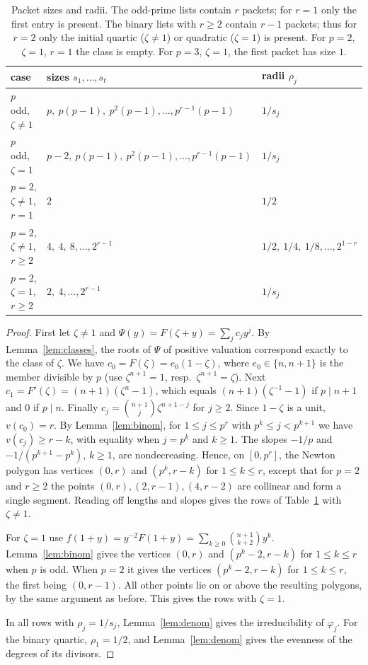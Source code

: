 \documentclass[11pt]{amsart}
\theoremstyle{definition}
\theoremstyle{remark}
\numberwithin{equation}{section}
\begin{document}
\begin{table}[ht]
\centering
\renewcommand{\arraystretch}{1.25}
\begin{tabular}{@{}lll@{}}
\toprule
case & sizes $s_1,\dots,s_t$ & radii $\rho_j$\\
\midrule
$p$ odd, $\zeta\ne1$ & $p,\ p(p-1),\ p^2(p-1),\dots,p^{r-1}(p-1)$
 & $1/s_j$\\
$p$ odd, $\zeta=1$ & $p-2,\ p(p-1),\ p^2(p-1),\dots,p^{r-1}(p-1)$
 & $1/s_j$\\
$p=2$, $\zeta\ne1$, $r=1$ & $2$ & $1/2$\\
$p=2$, $\zeta\ne1$, $r\ge2$ & $4,\ 4,\ 8,\dots,2^{r-1}$
 & $1/2,\ 1/4,\ 1/8,\dots,2^{1-r}$\\
$p=2$, $\zeta=1$, $r\ge2$ & $2,\ 4,\dots,2^{r-1}$ & $1/s_j$\\
\bottomrule
\end{tabular}
\medskip
\caption{Packet sizes and radii. The odd-prime lists contain $r$ packets;
for $r=1$ only the first entry is present. The binary lists with $r\ge2$
contain $r-1$ packets; thus for $r=2$ only the initial quartic
($\zeta\ne1$) or quadratic ($\zeta=1$) is present. For $p=2$, $\zeta=1$,
$r=1$ the class is empty. For $p=3$, $\zeta=1$, the first packet has size $1$.}
\label{tab:packets}
\end{table}

\begin{proof}
First let $\zeta\ne1$ and $\Psi(y)=F(\zeta+y)=\sum_jc_jy^j$. By
Lemma~\ref{lem:classes}, the roots of $\Psi$ of positive valuation
correspond exactly to the class of $\zeta$. We have
$c_0=F(\zeta)=e_0(1-\zeta)$, where $e_0\in\{n,n+1\}$ is the member divisible
by $p$ (use $\zeta^{n+1}=1$, resp.\ $\zeta^{n+1}=\zeta$). Next
$c_1=F'(\zeta)=(n+1)(\zeta^n-1)$, which equals $(n+1)(\zeta^{-1}-1)$ if $p\mid n+1$
and $0$ if $p\mid n$. Finally $c_j=\binom{n+1}j\zeta^{n+1-j}$ for $j\ge2$. Since
$1-\zeta$ is a unit, $v(c_0)=r$. By Lemma~\ref{lem:binom}, for
$1\le j\le p^r$ with $p^k\le j<p^{k+1}$ we have $v(c_j)\ge r-k$, with
equality when $j=p^k$ and $k\ge1$. The slopes $-1/p$ and
$-1/(p^{k+1}-p^k)$, $k\ge1$, are nondecreasing. Hence, on $[0,p^r]$, the
Newton polygon has vertices $(0,r)$ and $(p^k,r-k)$ for $1\le k\le r$,
except that for $p=2$ and $r\ge2$ the points $(0,r),(2,r-1),(4,r-2)$
are collinear and form a single segment. Reading off lengths and slopes gives the rows of
Table~\ref{tab:packets} with $\zeta\ne1$.

For $\zeta=1$ use $f(1+y)=y^{-2}F(1+y)=\sum_{k\ge0}\binom{n+1}{k+2}y^k$.
Lemma~\ref{lem:binom} gives the vertices $(0,r)$ and $(p^k-2,r-k)$ for
$1\le k\le r$ when $p$ is odd. When $p=2$ it gives the vertices
$(p^k-2,r-k)$ for $1\le k\le r$, the first being $(0,r-1)$. All other
points lie on or above the resulting polygons, by the same argument as
before. This gives the rows with $\zeta=1$.

In all rows with $\rho_j=1/s_j$, Lemma~\ref{lem:denom} gives the
irreducibility of $\varphi_j$. For the binary quartic, $\rho_1=1/2$, and
Lemma~\ref{lem:denom} gives the evenness of the degrees of its divisors.
\end{proof}
\end{document}
